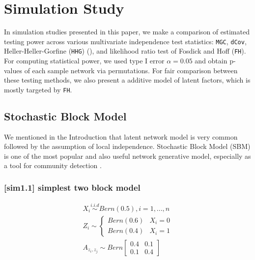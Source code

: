 \documentclass[12pt]{article}
\theoremstyle{definition}
\begin{document}
\section{Simulation Study}
\label{sec:sim}
	
In simulation studies presented in this paper, we make a comparison of estimated testing power across various multivariate independence test statistics: \texttt{MGC}, \texttt{dCov}, Heller-Heller-Gorfine (\texttt{HHG}) (\cite{heller2012consistent}), and likelihood ratio test of Fosdick and Hoff (\texttt{FH}). For computing statistical power, we used type I error $\alpha = 0.05$ and obtain p-values of each sample network via permutations. For fair comparison between these testing methods, we also present a additive model of latent factors, which is mostly targeted by \texttt{FH}.   
	
\subsection{Stochastic Block Model}

We mentioned in the Introduction that latent network model is very common followed by the assumption of local independence. Stochastic Block Model (SBM) is one of the most popular and also useful network generative model, especially as a tool for community detection \cite{karrer2011stochastic}. 
	
\subsubsection{[sim1.1] simplest two block model}
	
	\begin{equation}
	\begin{gathered}
	X_{i} \overset{i.i.d}{\sim} Bern(0.5), i = 1,... , n \\ 
	Z_{i}  \sim  \left\{  \begin{array}{cc} Bern(0.6) & X_{i} = 0 \\ Bern(0.4) & X_{i} = 1  \end{array} \right. \\
	A_{z_{i}, z_{j}} \sim Bern \left[  \begin{array}{cc}   0.4 & 0.1  \\ 0.1 & 0.4 \end{array}  \right]
	\end{gathered}
	\end{equation}
	
\end{document}
